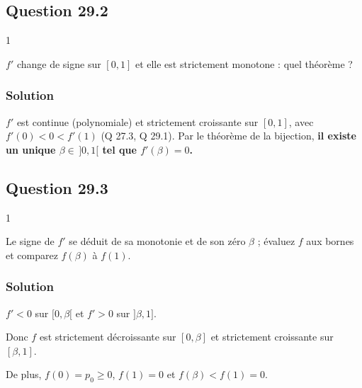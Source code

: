 \documentclass[11pt,a4paper]{article}
\begin{document}
\hypertarget{question-29.2}{%
\subsection{Question 29.2}\label{question-29.2}}

\begin{indication}{1}

\(f'\) change de signe sur \([0,1]\) et elle est strictement monotone : quel théorème ?

\end{indication}

\hypertarget{solution-69}{%
\subsubsection{Solution}\label{solution-69}}

\(f'\) est continue (polynomiale) et strictement croissante sur \([0,1]\), avec \(f'(0)<0<f'(1)\) (Q 27.3, Q 29.1). Par le théorème de la bijection, \textbf{il existe un unique \(\beta\in\,]0,1[\) tel que \(f'(\beta)=0\).}

\hypertarget{question-29.3}{%
\subsection{Question 29.3}\label{question-29.3}}

\begin{indication}{1}

Le signe de \(f'\) se déduit de sa monotonie et de son zéro \(\beta\) ; évaluez \(f\) aux bornes et comparez \(f(\beta)\) à \(f(1)\).

\end{indication}

\hypertarget{solution-70}{%
\subsubsection{Solution}\label{solution-70}}

\(f'<0\) sur \([0,\beta[\) et \(f'>0\) sur \(]\beta,1]\).

Donc \(f\) est strictement décroissante sur \([0,\beta]\) et strictement croissante sur \([\beta,1]\).

De plus, \(f(0)=p_0\ge0\), \(f(1)=0\) et \(f(\beta)<f(1)=0\).
\end{document}
